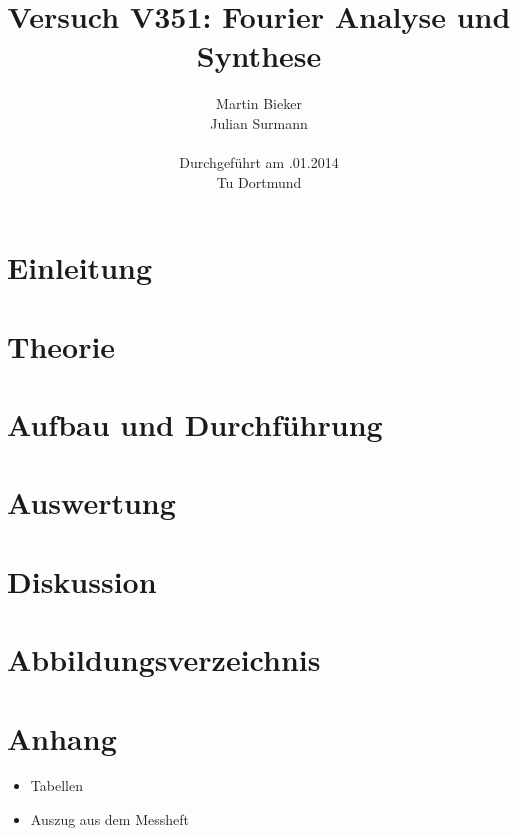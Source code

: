 \documentclass[11pt,ngerman,a4paper]{article}
\title{\textbf{Versuch V351: Fourier Analyse und Synthese}}
\author{Martin Bieker\\
		Julian Surmann\\
		\\
		Durchgef\"{u}hrt am .01.2014\\
		Tu Dortmund}
\date{}
\begin{document}
\renewcommand\tablename{Tabelle}
\renewcommand\figurename{Abbildung}
\maketitle
\thispagestyle{empty}
\newpage
\clearpage
\setcounter{page}{1}


\section{Einleitung}

\section{Theorie}

\section{Aufbau und Durchf\"{u}hrung}
\section{Auswertung}

\section{Diskussion}
\section{Abbildungsverzeichnis}
\section{Anhang}
\begin{itemize}
\item Tabellen
\item Auszug aus dem Messheft
\end{itemize}

\newpage
\end{document}
